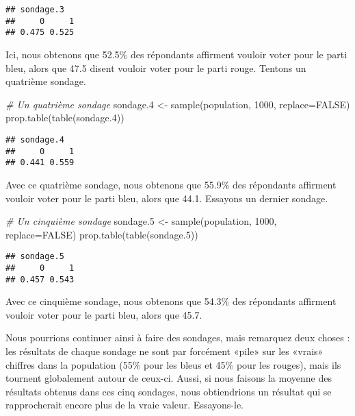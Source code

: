 \documentclass[
]{book}
\newenvironment{Shaded}{\begin{snugshade}}{\end{snugshade}}
\newcommand{\AttributeTok}[1]{\textcolor[rgb]{0.77,0.63,0.00}{#1}}
\newcommand{\CommentTok}[1]{\textcolor[rgb]{0.56,0.35,0.01}{\textit{#1}}}
\newcommand{\ConstantTok}[1]{\textcolor[rgb]{0.00,0.00,0.00}{#1}}
\newcommand{\DecValTok}[1]{\textcolor[rgb]{0.00,0.00,0.81}{#1}}
\newcommand{\FloatTok}[1]{\textcolor[rgb]{0.00,0.00,0.81}{#1}}
\newcommand{\FunctionTok}[1]{\textcolor[rgb]{0.00,0.00,0.00}{#1}}
\newcommand{\NormalTok}[1]{#1}
\newcommand{\OtherTok}[1]{\textcolor[rgb]{0.56,0.35,0.01}{#1}}
\begin{document}
\begin{verbatim}
## sondage.3
##     0     1 
## 0.475 0.525
\end{verbatim}

Ici, nous obtenons que 52.5\% des répondants affirment vouloir voter pour le parti bleu, alors que 47.5 disent vouloir voter pour le parti rouge. Tentons un quatrième sondage.

\begin{Shaded}
\begin{Highlighting}[]
\CommentTok{\# Un quatrième sondage}
\NormalTok{sondage}\FloatTok{.4} \OtherTok{\textless{}{-}} \FunctionTok{sample}\NormalTok{(population, }\DecValTok{1000}\NormalTok{, }\AttributeTok{replace=}\ConstantTok{FALSE}\NormalTok{)}
\FunctionTok{prop.table}\NormalTok{(}\FunctionTok{table}\NormalTok{(sondage}\FloatTok{.4}\NormalTok{))}
\end{Highlighting}
\end{Shaded}

\begin{verbatim}
## sondage.4
##     0     1 
## 0.441 0.559
\end{verbatim}

Avec ce quatrième sondage, nous obtenons que 55.9\% des répondants affirment vouloir voter pour le parti bleu, alors que 44.1. Essayons un dernier sondage.

\begin{Shaded}
\begin{Highlighting}[]
\CommentTok{\# Un cinquième sondage}
\NormalTok{sondage}\FloatTok{.5} \OtherTok{\textless{}{-}} \FunctionTok{sample}\NormalTok{(population, }\DecValTok{1000}\NormalTok{, }\AttributeTok{replace=}\ConstantTok{FALSE}\NormalTok{)}
\FunctionTok{prop.table}\NormalTok{(}\FunctionTok{table}\NormalTok{(sondage}\FloatTok{.5}\NormalTok{))}
\end{Highlighting}
\end{Shaded}

\begin{verbatim}
## sondage.5
##     0     1 
## 0.457 0.543
\end{verbatim}

Avec ce cinquième sondage, nous obtenons que 54.3\% des répondants affirment vouloir voter pour le parti bleu, alors que 45.7.

Nous pourrions continuer ainsi à faire des sondages, mais remarquez deux choses : les résultats de chaque sondage ne sont par forcément «pile» sur les «vrais» chiffres dans la population (55\% pour les bleus et 45\% pour les rouges), mais ils tournent globalement autour de ceux-ci. Aussi, si nous faisons la moyenne des résultats obtenus dans ces cinq sondages, nous obtiendrions un résultat qui se rapprocherait encore plus de la vraie valeur. Essayons-le.
\end{document}
